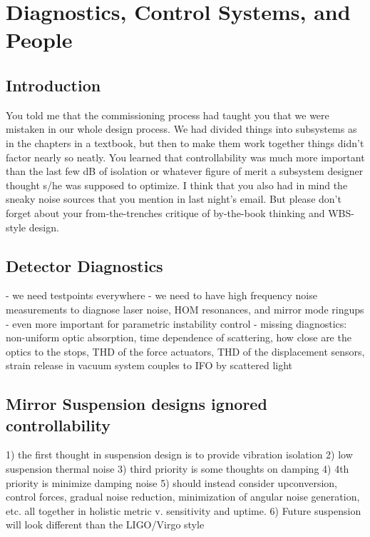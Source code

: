 \chapter[Diagnostics, Control Systems, and People]{Diagnostics, Control Systems, and People\label{ch7}}

\section{Introduction}\label{sec7.1}
You told me that the commissioning process had taught you that we were mistaken in our whole design process. We had divided things into subsystems as in the chapters in a textbook, but then to make them work together things didn’t factor nearly so neatly. You learned that controllability was much more important than the last few dB of isolation or whatever figure of merit a subsystem designer thought s/he was supposed to optimize. I think that you also had in mind the sneaky noise sources that you mention in last night’s email. But please don’t forget about your from-the-trenches critique of by-the-book thinking and WBS-style design.

\section{Detector Diagnostics}
   - we need testpoints everywhere
   - we need to have high frequency noise measurements to diagnose laser noise, HOM resonances, and mirror mode ringups
   - even more important for parametric instability control
   - missing diagnostics: non-uniform optic absorption, time dependence of scattering, how close are the optics to the stops, THD of the force actuators, THD of the displacement sensors, strain release in vacuum system couples to IFO by scattered light


\section{Mirror Suspension designs ignored controllability}
   1) the first thought in suspension design is to provide vibration isolation
   2) low suspension thermal noise
   3) third priority is some thoughts on damping
   4) 4th priority is minimize damping noise
   5) should instead consider upconversion, control forces, gradual noise reduction, minimization of angular noise generation, etc. all together in holistic metric v. sensitivity and uptime.
   6) Future suspension will look different than the LIGO/Virgo style


